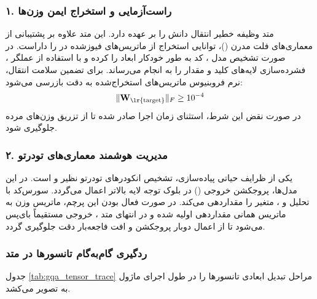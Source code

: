 \subsubsection*{۱. راست‌آزمایی و استخراج ایمن وزن‌ها }
متد  وظیفه خطیر انتقال دانش را بر عهده دارد. این متد علاوه بر پشتیبانی از معماری‌های فلت مدرن ()، توانایی استخراج از ماتریس‌های فیوزشده  در  را داراست. در صورت تشخیص مدل ، کد به طور خودکار ابعاد را  کرده و با استفاده از عملگر ، فشرده‌سازی لایه‌های کلید و مقدار را به انجام می‌رساند. برای تضمین سلامت انتقال، نرم فروبنیوس ماتریس‌های استخراج‌شده به دقت بازرسی می‌شود:
\begin{equation}
\|\mathbf{W}_{\text{\lr{target}}}\|_F \ge 10^{-4}
\end{equation}
در صورت نقض این شرط، استثنای زمان اجرا  صادر شده تا از تزریق وزن‌های مرده جلوگیری شود.

\subsubsection*{۲. مدیریت هوشمند معماری‌های تودرتو }
یکی از ظرایف حیاتی پیاده‌سازی، تشخیص انکودرهای تودرتو نظیر  و  است. در این مدل‌ها، پروجکشن خروجی () در بلوک توجه لایه بالاتر اعمال می‌گردد. سورس‌کد با تحلیل  و ، متغیر  را مقداردهی می‌کند. در صورت فعال بودن این پرچم، ماتریس وزن  به ماتریس همانی  مقداردهی اولیه شده و در انتهای متد ، خروجی مستقیماً بای‌پس می‌شود تا از اعمال دوبار پروجکشن و افت فاجعه‌بار دقت جلوگیری گردد.

\subsubsection*{ردگیری گام‌به‌گام تانسورها در متد }
جدول \ref{tab:gqa_tensor_trace} مراحل تبدیل ابعادی تانسورها را در طول اجرای ماژول به تصویر می‌کشد.

